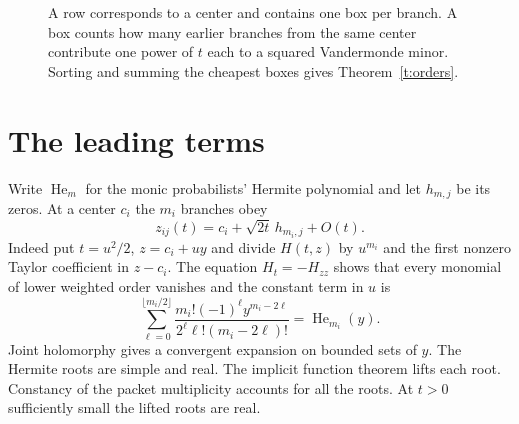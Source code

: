 \documentclass[11pt]{article}
\newcommand{\He}{\operatorname{He}}
\begin{document}
\begin{figure}[h]
\centering
{}
\caption{A row corresponds to a center and contains one box per branch. A box counts how many earlier branches from the same center contribute one power of $t$ each to a squared Vandermonde minor. Sorting and summing the cheapest boxes gives Theorem~\ref{t:orders}.}
\label{f:costs}
\end{figure}

\section{The leading terms}
Write $\He_m$ for the monic probabilists' Hermite polynomial and let $h_{m,j}$ be its zeros. At a center $c_i$ the $m_i$ branches obey
\[
 z_{ij}(t)=c_i+\sqrt{2t}\,h_{m_i,j}+O(t).
\]
Indeed put $t=u^2/2$, $z=c_i+uy$ and divide $H(t,z)$ by $u^{m_i}$ and the first nonzero Taylor coefficient in $z-c_i$. The equation $H_t=-H_{zz}$ shows that every monomial of lower weighted order vanishes and the constant term in $u$ is
\[
 \sum_{\ell=0}^{\lfloor m_i/2\rfloor}
   \frac{m_i!(-1)^\ell y^{m_i-2\ell}}{2^\ell\ell!(m_i-2\ell)!}
   =\He_{m_i}(y).
\]
Joint holomorphy gives a convergent expansion on bounded sets of $y$. The Hermite roots are simple and real. The implicit function theorem lifts each root. Constancy of the packet multiplicity accounts for all the roots. At $t>0$ sufficiently small the lifted roots are real.
\end{document}
